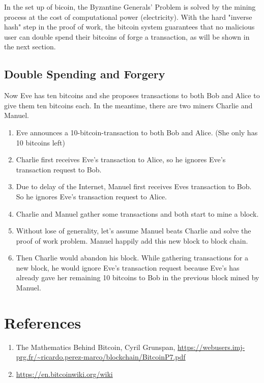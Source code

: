 \documentclass[12pt,a4paper]{article}
\begin{document}
In the set up of bicoin, the Byzantine Generals' Problem is solved by the mining process at the cost of computational power (electricity). With the hard "inverse hash" step in the proof of work, the bitcoin system guarantees that no malicious user can double spend their bitcoins of forge a transaction, as will be shown in the next section.
\subsection{Double Spending and Forgery} 
Now Eve has ten bitcoins and she proposes transactions to both Bob and Alice to give them ten bitcoins each. In the meantime, there are two miners Charlie and Manuel.
\begin{enumerate}
	\item Eve announces a 10-bitcoin-transaction to  both Bob and Alice. (She only has 10 bitcoins left)
	\item Charlie first receives Eve's transaction to Alice, so he ignores Eve's transaction request to Bob.
	\item Due to delay of the Internet, Manuel first receives Eves transaction to Bob. So he ignores Eve's transaction request to Alice.
	\item Charlie and Manuel gather some transactions and both start to mine a block. 
	\item Without lose of generality, let's assume Manuel beats Charlie and solve the proof of work problem. Manuel happily add this new block to block chain. 
	\item Then Charlie would abandon his block. While gathering transactions for a new block, he would ignore Eve's transaction request because Eve's has already gave her remaining 10 bitcoins to Bob in the previous block mined by Manuel. 
\end{enumerate}

\section{References}
\begin{enumerate}
	\item The Mathematics Behind Bitcoin, Cyril Grunspan, \url{https://webusers.imj-prg.fr/~ricardo.perez-marco/blockchain/BitcoinP7.pdf}
	\item \url{https://en.bitcoinwiki.org/wiki}
\end{enumerate}
\end{document}
